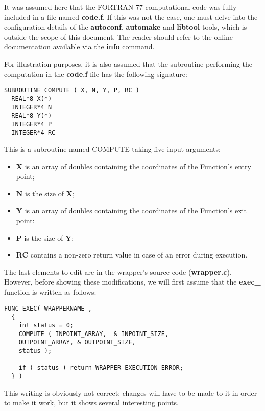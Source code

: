 It was assumed here that the FORTRAN 77 computational code was fully included in a file named {\bf code.f}. If this was not the case, one must delve into the configuration details of the {\bf autoconf}, {\bf automake} and {\bf libtool} tools, which is outside the scope of this document. The reader should refer to the online documentation available via the {\bf info} command.

For illustration purposes, it is also assumed that the subroutine performing the computation in the {\bf code.f} file has the following signature:

\lstset{language=FORTRAN, basicstyle=\normalsize}
\begin{lstlisting}[frame=TBRL]
  SUBROUTINE COMPUTE ( X, N, Y, P, RC )
  REAL*8 X(*)
  INTEGER*4 N
  REAL*8 Y(*)
  INTEGER*4 P
  INTEGER*4 RC
\end{lstlisting}

This is a subroutine named COMPUTE taking five input arguments:
\begin{itemize}
\item {\bf X} is an array of doubles containing the coordinates of the Function's entry point;
\item {\bf N} is the size of {\bf X};
\item {\bf Y} is an array of doubles containing the coordinates of the Function's exit point:
\item {\bf P} is the size of {\bf Y};
\item {\bf RC} contains a non-zero return value in case of an error during execution.
\end{itemize}

The last elements to edit are in the wrapper's source code ({\bf wrapper.c}). However, before showing these modifications, we will first assume that the {\bf exec\_} function is written as follows:

\lstset{language=C++, basicstyle=\normalsize}
\begin{lstlisting}[frame=TBRL]
  FUNC_EXEC( WRAPPERNAME ,
  {
    int status = 0;
    COMPUTE ( INPOINT_ARRAY,  & INPOINT_SIZE,
    OUTPOINT_ARRAY, & OUTPOINT_SIZE,
    status );

    if ( status ) return WRAPPER_EXECUTION_ERROR;
  } )
\end{lstlisting}

This writing is obviously not correct: changes will have to be made to it in order to make it work, but it shows several interesting points.

